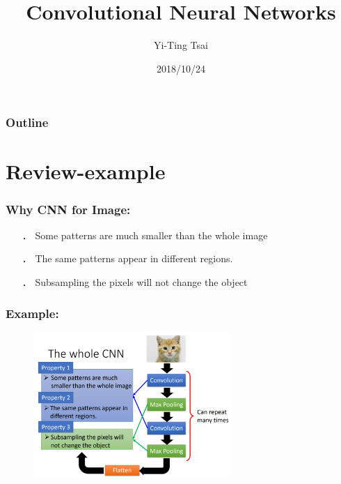 \documentclass{beamer}
\title{Convolutional Neural Networks}
\author{Yi-Ting Tsai}
\institute{National Sun Yat-sen University}
\date{2018/10/24}
\begin{document}
		\begin{frame}
		\titlepage
        \end{frame}

        \begin{frame}
		\frametitle{Outline} %
		\tableofcontents %
        \end{frame}
\section{Review-example}
    \begin{frame}
    \frametitle{Why CNN for Image: }
        \begin{itemize}
            \item[．] Some patterns are much smaller than the whole image
            \item[．] The same patterns appear in different regions.
            \item[．] Subsampling the pixels will not change the object
        \end{itemize}
    \end{frame}

    \begin{frame}
    \frametitle{Example: }
        \begin{figure}[H]
            \begin{center}
                \includegraphics[width=7.5cm]{ppt1}
            \end{center}
        \end{figure}
    \end{frame}
\end{document}
